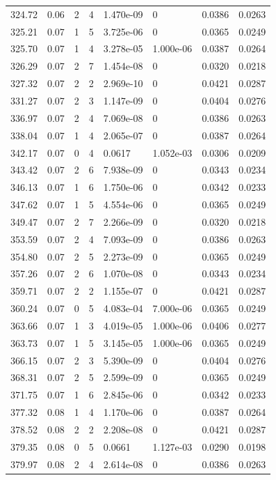 \documentclass[preview]{standalone}
\begin{document}
{{{{{\begin{tabular}{L{1.2cm}C{1.2cm} C{0.3cm}C{0.5cm} C{1.4cm}C{1.4cm} C{1.4cm}C{1.4cm}}
  324.72  &  0.06  & 2     &  4 &  1.470e-09  & 0  & 0.0386 &  0.0263   \\ 
  325.21  &  0.07  & 1     &  5 &  3.725e-06  & 0  & 0.0365 &  0.0249   \\ 
  325.70  &  0.07  & 1     &  4 &  3.278e-05  & 1.000e-06  & 0.0387 &  0.0264   \\ 
  326.29  &  0.07  & 2     &  7 &  1.454e-08  & 0  & 0.0320 &  0.0218   \\ 
  327.32  &  0.07  & 2     &  2 &  2.969e-10  & 0  & 0.0421 &  0.0287   \\ 
  331.27  &  0.07  & 2     &  3 &  1.147e-09  & 0  & 0.0404 &  0.0276   \\ 
  336.97  &  0.07  & 2     &  4 &  7.069e-08  & 0  & 0.0386 &  0.0263   \\ 
  338.04  &  0.07  & 1     &  4 &  2.065e-07  & 0  & 0.0387 &  0.0264   \\ 
  342.17  &  0.07  & 0     &  4 &  0.0617  & 1.052e-03  & 0.0306 &  0.0209   \\ 
  343.42  &  0.07  & 2     &  6 &  7.938e-09  & 0  & 0.0343 &  0.0234   \\ 
  346.13  &  0.07  & 1     &  6 &  1.750e-06  & 0  & 0.0342 &  0.0233   \\ 
  347.62  &  0.07  & 1     &  5 &  4.554e-06  & 0  & 0.0365 &  0.0249   \\ 
  349.47  &  0.07  & 2     &  7 &  2.266e-09  & 0  & 0.0320 &  0.0218   \\ 
  353.59  &  0.07  & 2     &  4 &  7.093e-09  & 0  & 0.0386 &  0.0263   \\ 
  354.80  &  0.07  & 2     &  5 &  2.273e-09  & 0  & 0.0365 &  0.0249   \\ 
  357.26  &  0.07  & 2     &  6 &  1.070e-08  & 0  & 0.0343 &  0.0234   \\ 
  359.71  &  0.07  & 2     &  2 &  1.155e-07  & 0  & 0.0421 &  0.0287   \\ 
  360.24  &  0.07  & 0     &  5 &  4.083e-04  & 7.000e-06  & 0.0365 &  0.0249   \\ 
  363.66  &  0.07  & 1     &  3 &  4.019e-05  & 1.000e-06  & 0.0406 &  0.0277   \\ 
  363.73  &  0.07  & 1     &  5 &  3.145e-05  & 1.000e-06  & 0.0365 &  0.0249   \\ 
  366.15  &  0.07  & 2     &  3 &  5.390e-09  & 0  & 0.0404 &  0.0276   \\ 
  368.31  &  0.07  & 2     &  5 &  2.599e-09  & 0  & 0.0365 &  0.0249   \\ 
  371.75  &  0.07  & 1     &  6 &  2.845e-06  & 0  & 0.0342 &  0.0233   \\ 
  377.32  &  0.08  & 1     &  4 &  1.170e-06  & 0  & 0.0387 &  0.0264   \\ 
  378.52  &  0.08  & 2     &  2 &  2.208e-08  & 0  & 0.0421 &  0.0287   \\ 
  379.35  &  0.08  & 0     &  5 &  0.0661  & 1.127e-03  & 0.0290 &  0.0198   \\ 
  379.97  &  0.08  & 2     &  4 &  2.614e-08  & 0  & 0.0386 &  0.0263   \\ 
\hline 
\end{tabular} 

}}}}}
\end{document}

